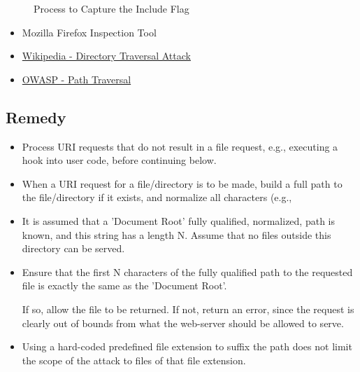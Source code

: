 \begin{figure}[!htb]
    \caption[Flag 02 Method]{Process to Capture the Include Flag} %
    \label{fig:flag02 method}
\end{figure}

\begin{itemize}
    \item Mozilla Firefox Inspection Tool
    \item \href{https://en.wikipedia.org/wiki/Directory\_traversal\_attack}{Wikipedia - Directory Traversal Attack}
    \item \href{https://owasp.org/www-community/attacks/Path\_Traversal}{OWASP - Path Traversal}
\end{itemize}

\subsection{Remedy}

\begin{itemize}
    \item Process URI requests that do not result in a file request, e.g., executing a hook into user code, before continuing below.
    \item When a URI request for a file/directory is to be made, build a full path to the file/directory if it exists, and normalize all characters (e.g., %
    \item It is assumed that a 'Document Root' fully qualified, normalized, path is known, and this string has a length N. Assume that no files outside this directory can be served.
    \item Ensure that the first N characters of the fully qualified path to the requested file is exactly the same as the 'Document Root'.
    
    If so, allow the file to be returned.
    If not, return an error, since the request is clearly out of bounds from what the web-server should be allowed to serve.
    
    \item Using a hard-coded predefined file extension to suffix the path does not limit the scope of the attack to files of that file extension.
    
\end{itemize}